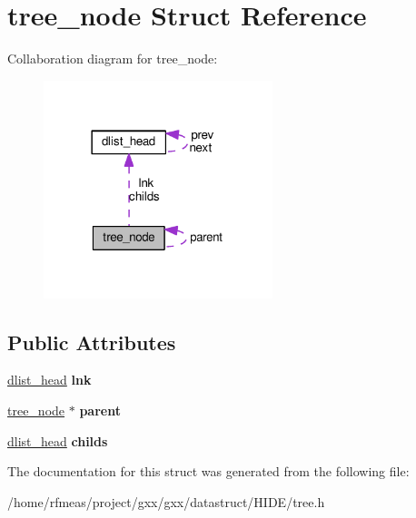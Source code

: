 \hypertarget{structtree__node}{}\section{tree\+\_\+node Struct Reference}
\label{structtree__node}


Collaboration diagram for tree\+\_\+node\+:
\nopagebreak
\begin{figure}[H]
\begin{center}
\leavevmode
\includegraphics[width=189pt]{structtree__node__coll__graph}
\end{center}
\end{figure}
\subsection*{Public Attributes}
\begin{DoxyCompactItemize}
\item 
\hyperlink{structdlist__head}{dlist\+\_\+head} {\bfseries lnk}\hypertarget{structtree__node_a9bfd7e5c564fdd0d8e1d31dcc82d96ba}{}\label{structtree__node_a9bfd7e5c564fdd0d8e1d31dcc82d96ba}

\item 
\hyperlink{structtree__node}{tree\+\_\+node} $\ast$ {\bfseries parent}\hypertarget{structtree__node_a649ed45f2f6567a59e9cd53024a8ba41}{}\label{structtree__node_a649ed45f2f6567a59e9cd53024a8ba41}

\item 
\hyperlink{structdlist__head}{dlist\+\_\+head} {\bfseries childs}\hypertarget{structtree__node_a6687b28c81a7285a834697762237be4e}{}\label{structtree__node_a6687b28c81a7285a834697762237be4e}

\end{DoxyCompactItemize}


The documentation for this struct was generated from the following file\+:\begin{DoxyCompactItemize}
\item 
/home/rfmeas/project/gxx/gxx/datastruct/\+H\+I\+D\+E/tree.\+h\end{DoxyCompactItemize}

